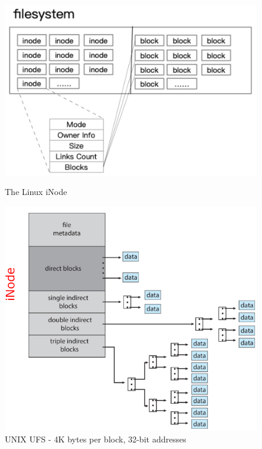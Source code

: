 \begin{figure}[h!]
    \begin{minipage}[h!]{0.5\textwidth}
        \centering
        \includegraphics[width=1\linewidth]{img/dfnsb.png}
    \caption{The Linux iNode}
    \end{minipage}
    \begin{minipage}[h!]{0.5\textwidth}
    \centering
    \includegraphics[width=1\linewidth]{img/smgth.png}
    \caption{UNIX UFS - 4K bytes per block, 32-bit addresses} 
    \end{minipage}
\end{figure}


